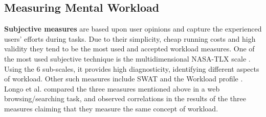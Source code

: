 \documentclass[../main/Feedback.tex]{subfiles}
\begin{document}
\subsection{Measuring Mental Workload}

\textbf{Subjective measures} are based upon user opinions and capture the experienced users' efforts during tasks.
Due to their simplicity, cheap running costs and high validity they tend to be the most used and accepted workload measures.
One of the most used subjective technique is the multidimensional NASA-TLX scale \cite{nasatlx}.
Using the 6 sub-scales, it provides high diagnosticity, identifying different aspects of workload. Other such measures include SWAT \cite{reid1988subjective} and the Workload profile \cite{tsang1996diagnosticity}. Longo et al. \cite{longo2012importance} compared the three measures mentioned above in a web browsing/searching task, and observed correlations in the results of the three measures claiming that they measure the same concept of workload.
\end{document}
